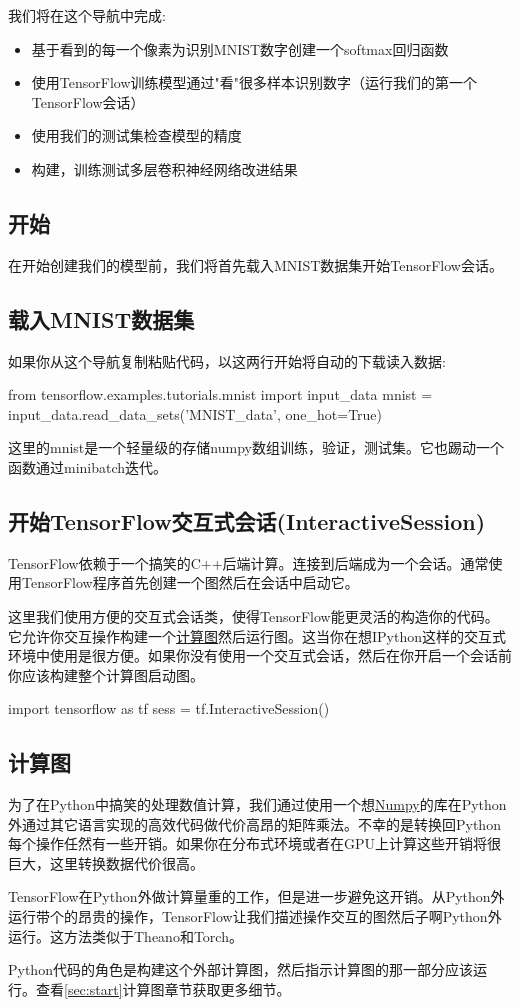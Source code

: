 我们将在这个导航中完成:
\begin{itemize}
\item 基于看到的每一个像素为识别MNIST数字创建一个softmax回归函数
\item 使用TensorFlow训练模型通过"看"很多样本识别数字（运行我们的第一个TensorFlow会话）
\item 使用我们的测试集检查模型的精度
\item 构建，训练测试多层卷积神经网络改进结果
\end{itemize}
\subsection{开始}
在开始创建我们的模型前，我们将首先载入MNIST数据集开始TensorFlow会话。
\subsection{载入MNIST数据集}
如果你从这个导航复制粘贴代码，以这两行开始将自动的下载读入数据:
\begin{pythoncode}
from tensorflow.examples.tutorials.mnist import input_data
mnist = input_data.read_data_sets('MNIST_data', one_hot=True)
\end{pythoncode}
这里的mnist是一个轻量级的存储numpy数组训练，验证，测试集。它也踢动一个函数通过minibatch迭代。
\subsection{开始TensorFlow交互式会话(InteractiveSession)}
TensorFlow依赖于一个搞笑的C++后端计算。连接到后端成为一个会话。通常使用TensorFlow程序首先创建一个图然后在会话中启动它。

这里我们使用方便的交互式会话类，使得TensorFlow能更灵活的构造你的代码。它允许你交互操作构建一个\href{https://www.tensorflow.org/get_started/get_started#the_computational_graph}{计算图}然后运行图。这当你在想IPython这样的交互式环境中使用是很方便。如果你没有使用一个交互式会话，然后在你开启一个会话前你应该构建整个计算图启动图。
\begin{pythoncode}
import tensorflow as tf
sess = tf.InteractiveSession()
\end{pythoncode}
\subsection{计算图}
为了在Python中搞笑的处理数值计算，我们通过使用一个想\href{http://www.numpy.org/}{Numpy}的库在Python外通过其它语言实现的高效代码做代价高昂的矩阵乘法。不幸的是转换回Python每个操作任然有一些开销。如果你在分布式环境或者在GPU上计算这些开销将很巨大，这里转换数据代价很高。

TensorFlow在Python外做计算量重的工作，但是进一步避免这开销。从Python外运行带个的昂贵的操作，TensorFlow让我们描述操作交互的图然后子啊Python外运行。这方法类似于Theano和Torch。

Python代码的角色是构建这个外部计算图，然后指示计算图的那一部分应该运行。查看\ref{sec:start}计算图章节获取更多细节。
